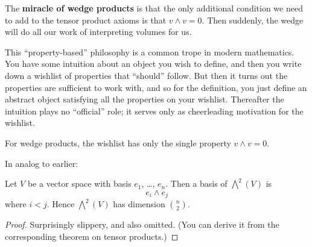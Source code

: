 The \textbf{miracle of wedge products} is that the only additional condition
we need to add to the tensor product axioms is that $v \wedge v = 0$.
Then suddenly, the wedge will do all our work of interpreting volumes for us.

\begin{remark*}
	This ``property-based'' philosophy is a common trope in modern mathematics.
	You have some intuition about an object you wish to define,
	and then you write down a wishlist of properties that ``should'' follow.
	But then it turns out the properties are sufficient to work with,
	and so for the definition, you just define an abstract object
	satisfying all the properties on your wishlist.
	Thereafter the intuition plays no ``official'' role;
	it serves only as cheerleading motivation for the wishlist.

	For wedge products,
	the wishlist has only the single property $v \wedge v = 0$.
\end{remark*}

In analog to earlier:
\begin{proposition}
	Let $V$ be a vector space
	with basis $e_1$, \dots, $e_n$.
	Then a basis of $\bigwedge^2(V)$ is
	\[ e_i \wedge e_j \]
	where $i < j$.
	Hence $\bigwedge^2(V)$ has dimension $\binom n2$.
\end{proposition}
\begin{proof}
	Surprisingly slippery, and also omitted.
	(You can derive it from the corresponding theorem on tensor products.)
\end{proof}

